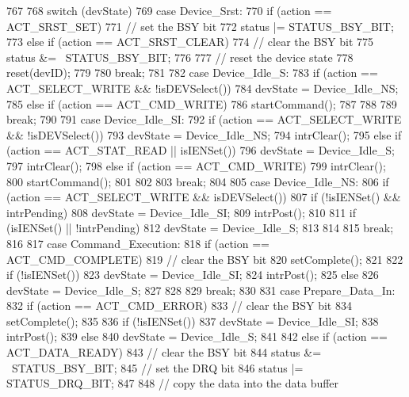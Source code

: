 \begin{DoxyCode}
767 {
768     switch (devState) {
769       case Device_Srst:
770         if (action == ACT_SRST_SET) {
771             // set the BSY bit
772             status |= STATUS_BSY_BIT;
773         } else if (action == ACT_SRST_CLEAR) {
774             // clear the BSY bit
775             status &= ~STATUS_BSY_BIT;
776 
777             // reset the device state
778             reset(devID);
779         }
780         break;
781 
782       case Device_Idle_S:
783         if (action == ACT_SELECT_WRITE && !isDEVSelect()) {
784             devState = Device_Idle_NS;
785         } else if (action == ACT_CMD_WRITE) {
786             startCommand();
787         }
788 
789         break;
790 
791       case Device_Idle_SI:
792         if (action == ACT_SELECT_WRITE && !isDEVSelect()) {
793             devState = Device_Idle_NS;
794             intrClear();
795         } else if (action == ACT_STAT_READ || isIENSet()) {
796             devState = Device_Idle_S;
797             intrClear();
798         } else if (action == ACT_CMD_WRITE) {
799             intrClear();
800             startCommand();
801         }
802 
803         break;
804 
805       case Device_Idle_NS:
806         if (action == ACT_SELECT_WRITE && isDEVSelect()) {
807             if (!isIENSet() && intrPending) {
808                 devState = Device_Idle_SI;
809                 intrPost();
810             }
811             if (isIENSet() || !intrPending) {
812                 devState = Device_Idle_S;
813             }
814         }
815         break;
816 
817       case Command_Execution:
818         if (action == ACT_CMD_COMPLETE) {
819             // clear the BSY bit
820             setComplete();
821 
822             if (!isIENSet()) {
823                 devState = Device_Idle_SI;
824                 intrPost();
825             } else {
826                 devState = Device_Idle_S;
827             }
828         }
829         break;
830 
831       case Prepare_Data_In:
832         if (action == ACT_CMD_ERROR) {
833             // clear the BSY bit
834             setComplete();
835 
836             if (!isIENSet()) {
837                 devState = Device_Idle_SI;
838                 intrPost();
839             } else {
840                 devState = Device_Idle_S;
841             }
842         } else if (action == ACT_DATA_READY) {
843             // clear the BSY bit
844             status &= ~STATUS_BSY_BIT;
845             // set the DRQ bit
846             status |= STATUS_DRQ_BIT;
847 
848             // copy the data into the data buffer
}}}
\end{DoxyCode}
